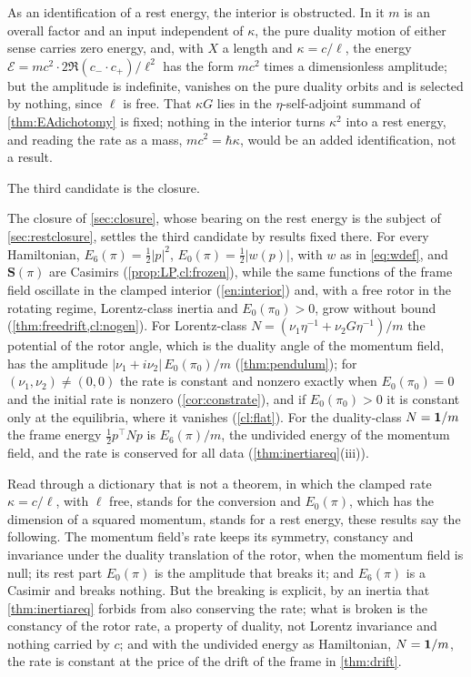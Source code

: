 As an identification of a rest energy, the interior is obstructed. In it $m$ is an overall factor and an input independent of $\kappa$, the pure
duality motion of either sense carries zero energy, and, with $X$ a length and $\kappa=c/\ell$, the energy
$\mathcal E=mc^2\cdot2\Re(c_-\cdot c_+)/\ell^2$ has the form $mc^2$ times a dimensionless amplitude; but the amplitude is indefinite, vanishes on the
pure duality orbits and is selected by nothing, since $\ell$ is free. That $\kappa G$ lies in the $\eta$-self-adjoint summand of
\cref{thm:EAdichotomy} is fixed; nothing in the interior turns $\kappa^2$ into a rest energy, and reading the rate as a mass, $mc^2=\hbar\kappa$, would
be an added identification, not a result.

The third candidate is the closure.

\begin{remark}
\label{en:closure}
The closure of \cref{sec:closure}, whose bearing on the rest energy is the subject of \cref{sec:restclosure}, settles the third candidate by
results fixed there. For every Hamiltonian, $E_6(\pi)=\tfrac12|p|^2$, $E_0(\pi)=\tfrac12|w(p)|$, with $w$ as in \eqref{eq:wdef}, and
$\mathbf S(\pi)$ are Casimirs (\cref{prop:LP,cl:frozen}), while the same functions of the frame field oscillate in the clamped interior
(\cref{en:interior}) and, with a free rotor in the rotating regime, Lorentz-class inertia and $E_0(\pi_0)>0$, grow without bound
(\cref{thm:freedrift,cl:nogen}). For Lorentz-class $N=(\nu_1\eta^{-1}+\nu_2G\eta^{-1})/m$ the potential of the rotor angle, which is the
duality angle of the momentum field, has the amplitude $|\nu_1+i\nu_2|\,E_0(\pi_0)/m$ (\cref{thm:pendulum}); for $(\nu_1,\nu_2)\neq(0,0)$ the
rate is constant and nonzero exactly when $E_0(\pi_0)=0$ and the initial rate is nonzero (\cref{cor:constrate}), and if $E_0(\pi_0)>0$ it is
constant only at the equilibria, where it vanishes (\cref{cl:flat}). For the duality-class $N=\mathbf 1/m$ the frame energy
$\tfrac12p^{\!\top}Np$ is $E_6(\pi)/m$, the undivided energy of the momentum field, and the rate is conserved for all data
(\cref{thm:inertiareq}(iii)).
\end{remark}

Read through a dictionary that is not a theorem, in which the clamped rate $\kappa=c/\ell$, with $\ell$ free, stands for the conversion and
$E_0(\pi)$, which has the dimension of a squared momentum, stands for a rest energy, these results say the following. The momentum field's rate keeps its symmetry, constancy and invariance under the duality translation of the rotor, when the momentum
field is null; its rest part $E_0(\pi)$ is the amplitude that breaks it; and $E_6(\pi)$ is a Casimir and breaks nothing. But the breaking is explicit,
by an inertia that \cref{thm:inertiareq} forbids from also conserving the rate; what is broken is the constancy of the rotor rate, a property of
duality, not Lorentz invariance and nothing carried by $c$; and with the undivided energy as Hamiltonian, $N=\mathbf 1/m$, the rate is constant at the
price of the drift of the frame in \cref{thm:drift}.

